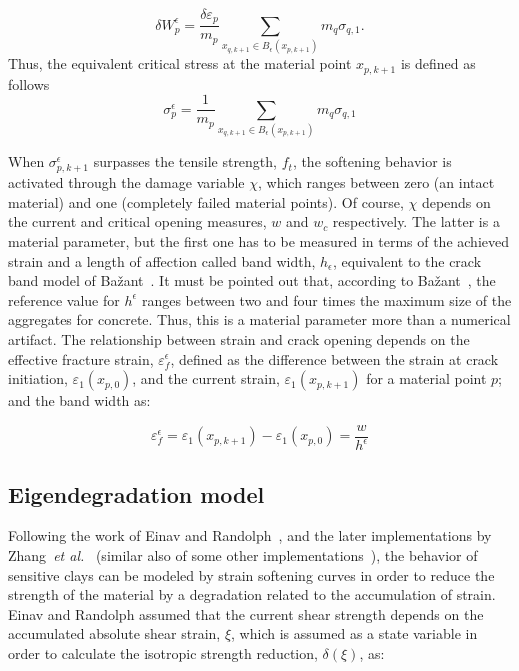 \documentclass[applsci,journal,article,submit,moreauthors,pdftex]{Definitions/mdpi}
\begin{document}
\begin{equation}\label{eq_Wp_3}
\delta W^\epsilon_{p}=\frac{\delta \varepsilon_p} {m_{p}} \sum_{x_{q,k+1}\in B_\epsilon (x_{p,k+1})} m_q \sigma_{q, 1}.
\end{equation}
Thus, the equivalent critical stress at the material point $x_{p, k+1}$ is defined as follows
\begin{equation}\label{eq_sigmap}
\sigma^{\epsilon}_{p}=\frac{1}{m_{p}}\sum_{x_{q,k+1}\in B_\epsilon (x_{p,k+1})}m_q \sigma_{q, 1}
\end{equation}

When $\sigma^{\epsilon}_{p,k+1}$ surpasses the tensile strength, $f_t$,  the softening behavior is activated through the damage variable $\chi$, which ranges between zero (an intact material) and one (completely failed material points). Of course, $\chi$ depends on the current and critical opening measures, $w$ and $w_c$ respectively.  The latter is a material parameter, but the first one has to be measured in terms of the achieved strain and a length of affection called band width, $h_\epsilon$, equivalent to the crack band model of Ba\v{z}ant~\cite{Bazant83}. It must be pointed out that, according to Ba\v{z}ant~\cite{Bazant98}, the reference value for $h^{\epsilon}$ ranges between two and four times the maximum size of the aggregates for concrete. Thus, this is a material parameter more than a numerical artifact. The relationship between strain and crack opening depends on the effective fracture strain, $\varepsilon^{\epsilon}_f$, defined as the difference between the strain at crack initiation, $\varepsilon_1(x_{p,0})$, and the current strain, $ \varepsilon_1(x_{p,k+1})$ for a material point $p$; and the band width as:

\begin{equation} \label{eq15}
 \varepsilon_f^{\epsilon} = \varepsilon_1(x_{p,k+1}) - \varepsilon_1(x_{p,0})  =  \frac{w}{h^{\epsilon}}
\end{equation}

\subsection{Eigendegradation model}
Following the work of Einav and Randolph~\cite{Zhang2015}, and the later implementations by Zhang~\textit{et al.}~\cite{Zhang2015} (similar also of some other implementations~\cite{Wang21,Singh21}), the behavior of sensitive clays can be modeled by strain softening curves in order to reduce the strength of the material by a degradation related to the accumulation of strain. Einav and Randolph assumed that the current shear strength depends on the accumulated absolute shear strain, $\xi$, which is assumed as a state variable in order to calculate the isotropic strength reduction, $\delta(\xi)$, as:
\end{document}
